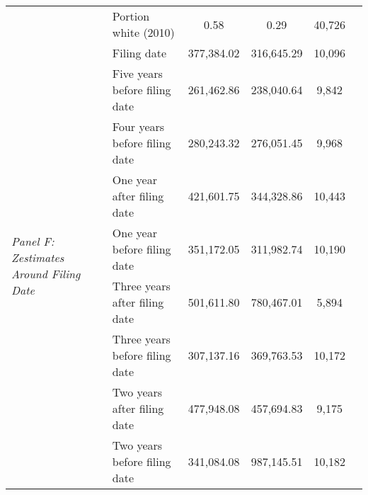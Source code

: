 \begin{tabular}{llcccc}
 & Portion white (2010) & 0.58 & 0.29 & 40,726 \\
\cline{1-5}
\multirow[c]{9}{4cm}{\textit{Panel F: Zestimates Around Filing Date}} & Filing date & 377,384.02 & 316,645.29 & 10,096 \\
 & Five years before filing date & 261,462.86 & 238,040.64 & 9,842 \\
 & Four years before filing date & 280,243.32 & 276,051.45 & 9,968 \\
 & One year after filing date & 421,601.75 & 344,328.86 & 10,443 \\
 & One year before filing date & 351,172.05 & 311,982.74 & 10,190 \\
 & Three years after filing date & 501,611.80 & 780,467.01 & 5,894 \\
 & Three years before filing date & 307,137.16 & 369,763.53 & 10,172 \\
 & Two years after filing date & 477,948.08 & 457,694.83 & 9,175 \\
 & Two years before filing date & 341,084.08 & 987,145.51 & 10,182 \\
\cline{1-5}
\bottomrule
\end{tabular}
